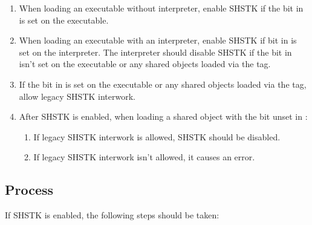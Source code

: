 \begin{enumerate}
  \item
    \begin{sloppypar}
      When loading an executable without interpreter, enable SHSTK if
      the  bit in
       is set on the executable.
    \end{sloppypar}
  \item
    \begin{sloppypar}
      When loading an executable with an interpreter, enable SHSTK if
       bit in
       is set on the interpreter.
      The interpreter should disable SHSTK if the
       bit in
       isn't set on the executable
      or any shared objects loaded via the  tag.
    \end{sloppypar}
   \item If the  bit in
      is set on the
     executable or any shared objects loaded via the
      tag, allow legacy SHSTK interwork.
  \item
    \begin{sloppypar}
      After SHSTK is enabled, when loading a shared object with the
       bit unset in
      :
    \end{sloppypar}
    \begin{enumerate}
      \item If legacy SHSTK interwork is allowed, SHSTK should be
        disabled.
      \item If legacy SHSTK interwork isn't allowed, it causes an
        error.
    \end{enumerate}
\end{enumerate}

\subsection{Process }
\label{shstk}

If SHSTK is enabled, the following steps should be taken:

